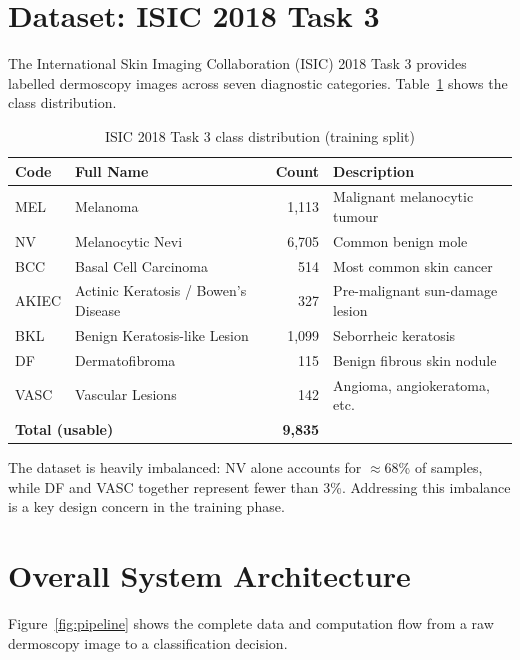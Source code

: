 \documentclass[12pt,a4paper]{report}
\begin{document}
\section{Dataset: ISIC 2018 Task 3}

The International Skin Imaging Collaboration (ISIC) 2018 Task 3 provides labelled dermoscopy images across seven diagnostic categories. Table~\ref{tab:classes} shows the class distribution.

\begin{table}[ht]
  \centering
  \caption{ISIC 2018 Task 3 class distribution (training split)}
  \label{tab:classes}
  \begin{tabular}{llrp{6cm}}
    \toprule
    \textbf{Code} & \textbf{Full Name} & \textbf{Count} & \textbf{Description} \\
    \midrule
    MEL   & Melanoma                              & 1{,}113 & Malignant melanocytic tumour \\
    NV    & Melanocytic Nevi                      & 6{,}705 & Common benign mole \\
    BCC   & Basal Cell Carcinoma                  &   514   & Most common skin cancer \\
    AKIEC & Actinic Keratosis / Bowen's Disease   &   327   & Pre-malignant sun-damage lesion \\
    BKL   & Benign Keratosis-like Lesion          & 1{,}099 & Seborrheic keratosis \\
    DF    & Dermatofibroma                        &   115   & Benign fibrous skin nodule \\
    VASC  & Vascular Lesions                      &   142   & Angioma, angiokeratoma, etc. \\
    \midrule
    \multicolumn{2}{l}{\textbf{Total (usable)}} & \textbf{9{,}835} & \\
    \bottomrule
  \end{tabular}
\end{table}

The dataset is heavily imbalanced: NV alone accounts for $\approx$68\% of samples, while DF and VASC together represent fewer than 3\%. Addressing this imbalance is a key design concern in the training phase.

\section{Overall System Architecture}

Figure~\ref{fig:pipeline} shows the complete data and computation flow from a raw dermoscopy image to a classification decision.
\end{document}
